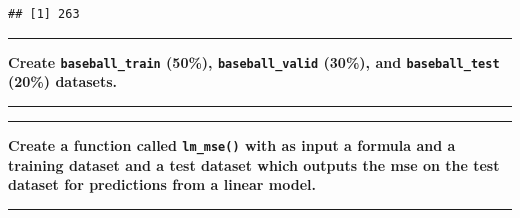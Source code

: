 \documentclass[12pt,]{article}
\newenvironment{Shaded}{\begin{snugshade}}{\end{snugshade}}
\newcommand{\DataTypeTok}[1]{\textcolor[rgb]{0.13,0.29,0.53}{#1}}
\newcommand{\DecValTok}[1]{\textcolor[rgb]{0.00,0.00,0.81}{#1}}
\newcommand{\KeywordTok}[1]{\textcolor[rgb]{0.13,0.29,0.53}{\textbf{#1}}}
\newcommand{\NormalTok}[1]{#1}
\newcommand{\OperatorTok}[1]{\textcolor[rgb]{0.81,0.36,0.00}{\textbf{#1}}}
\newcommand{\StringTok}[1]{\textcolor[rgb]{0.31,0.60,0.02}{#1}}
\begin{document}
\begin{verbatim}
## [1] 263
\end{verbatim}

\begin{center}\rule{0.5\linewidth}{\linethickness}\end{center}

\textbf{Create \texttt{baseball\_train} (50\%), \texttt{baseball\_valid}
(30\%), and \texttt{baseball\_test} (20\%) datasets.}

\begin{center}\rule{0.5\linewidth}{\linethickness}\end{center}

\begin{Shaded}
\end{Shaded}

\begin{center}\rule{0.5\linewidth}{\linethickness}\end{center}

\textbf{Create a function called \texttt{lm\_mse()} with as input a
formula and a training dataset and a test dataset which outputs the mse
on the test dataset for predictions from a linear model.}

\begin{center}\rule{0.5\linewidth}{\linethickness}\end{center}
\end{document}
